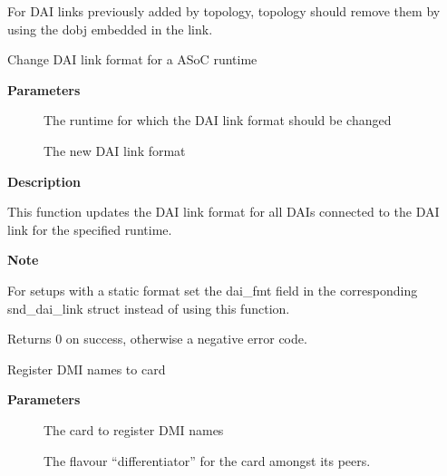 \documentclass[a4paper,8pt,english]{sphinxmanual}
\begin{document}
For DAI links previously added by topology, topology should
remove them by using the dobj embedded in the link.

\begin{fulllineitems}
\label{sound/kernel-api/alsa-driver-api:c.snd_soc_runtime_set_dai_fmt}
Change DAI link format for a ASoC runtime

\end{fulllineitems}


\textbf{Parameters}
\begin{description}
\item[{}] \leavevmode
The runtime for which the DAI link format should be changed

\item[{}] \leavevmode
The new DAI link format

\end{description}

\textbf{Description}

This function updates the DAI link format for all DAIs connected to the DAI
link for the specified runtime.

\textbf{Note}

For setups with a static format set the dai\_fmt field in the
corresponding snd\_dai\_link struct instead of using this function.

Returns 0 on success, otherwise a negative error code.

\begin{fulllineitems}
\label{sound/kernel-api/alsa-driver-api:c.snd_soc_set_dmi_name}
Register DMI names to card

\end{fulllineitems}


\textbf{Parameters}
\begin{description}
\item[{}] \leavevmode
The card to register DMI names

\item[{}] \leavevmode
The flavour ``differentiator'' for the card amongst its peers.

\end{description}
\end{document}
